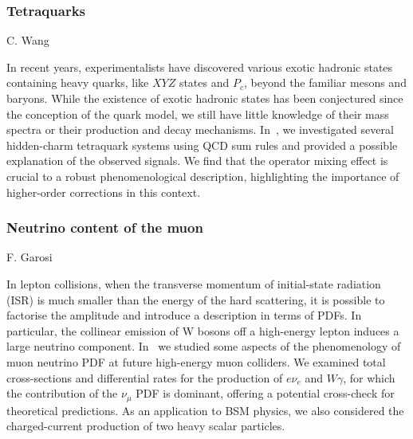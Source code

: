 \documentclass{FBR_Bericht_2025}
\begin{document}
\begin{refsection}
\subsubsection{Tetraquarks}
\begin{Namen}
C. Wang
\end{Namen}
%
In recent years, experimentalists have discovered various exotic hadronic states containing heavy quarks, like $X Y Z$ states and $P_{c}$, beyond the familiar mesons and baryons.
While the existence of exotic hadronic states has been conjectured since the conception of the quark model, we still have little knowledge of their mass spectra or their production and decay mechanisms.
In~\cite{Wu:2023ntn}, we investigated several hidden-charm tetraquark systems using QCD sum rules and provided a possible explanation of the observed signals.
We find that the operator mixing effect is crucial to a robust phenomenological description, highlighting the importance of higher-order corrections in this context.
%
\subsubsection{Neutrino content of the muon}
\begin{Namen}
F. Garosi
\end{Namen}
In lepton collisions, when the transverse momentum of initial-state radiation (ISR) is much smaller than the energy of the hard scattering, it is possible to factorise the amplitude and introduce a description in terms of PDFs. In particular, the collinear emission of W bosons off a high-energy lepton induces a large neutrino component. In~ we studied some aspects of the phenomenology of muon neutrino PDF at future high-energy muon colliders. We examined total cross-sections and differential rates for the production of $e\nu_e$ and $W\gamma$, for which the contribution of the $\nu_\mu$ PDF is dominant, offering a potential cross-check for theoretical predictions. As an application to BSM physics, we also considered the charged-current production of two heavy scalar particles. 
%
\printbibliography[heading=subbibliography]
\end{refsection}
\end{document}
